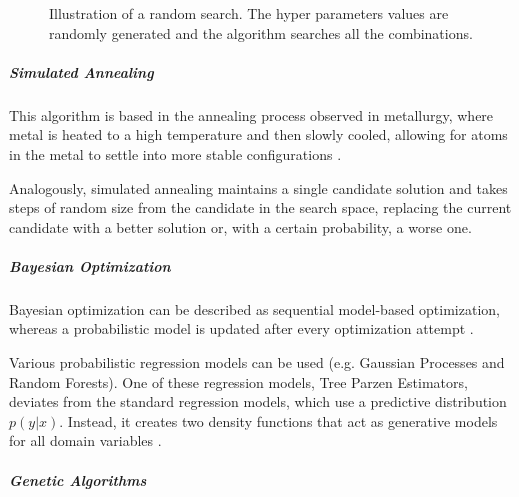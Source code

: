 \begin{figure}[ht]
	\centering
    \caption{Illustration of a random search. The hyper parameters values are randomly generated and the algorithm searches all the combinations.}
    \label{random}
 \end{figure}

\subparagraph{Simulated Annealing}

This algorithm is based in the annealing process observed in metallurgy, where metal is heated to a high temperature and then slowly cooled, allowing for atoms in the metal to settle into more stable configurations \parencite{elshawi2019automated}.

Analogously, simulated annealing maintains a single candidate solution and takes steps of random size from the candidate in the search space, replacing the current candidate with a better solution or, with a certain probability, a worse one.

\subparagraph{Bayesian Optimization}

Bayesian optimization can be described as sequential model-based optimization, whereas a probabilistic model is updated after every optimization attempt \parencite{dewancker}.

Various probabilistic regression models can be used (e.g. Gaussian Processes and Random Forests). One of these regression models, Tree Parzen Estimators, deviates from the standard regression models, which use a predictive distribution $p(y|x)$. Instead, it creates two density functions that act as generative models for all domain variables \parencite{NIPS2011_86e8f7ab}\parencite{elshawi2019automated}.

\subparagraph{Genetic Algorithms}

